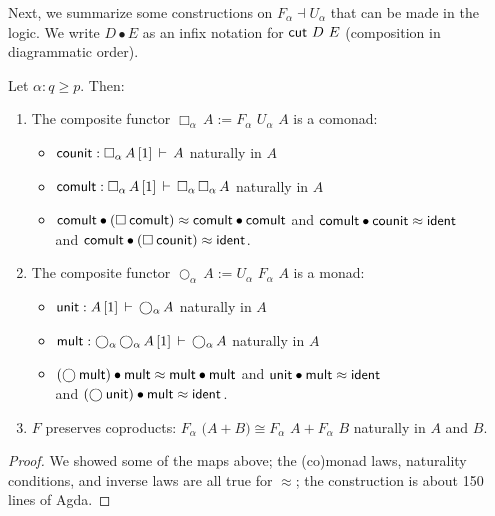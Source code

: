\documentclass{drl-common/llncs}
\newcommand{\la}{\ensuremath{\dashv}}
\newcommand\F[2]{\ensuremath{F_{#1} \,\, #2}}
\newcommand\U[2]{\ensuremath{U_{#1} \,\, #2}}
\newcommand\coprd[2]{\ensuremath{#1 + #2}}
\newcommand\seq[3]{\ensuremath{#1 \, [ #2 ] \, \vdash \, #3}}
\newcommand\ident[1]{\ensuremath{\dsd{ident}_{#1}}}
\newcommand\cutsym{\ensuremath{\dsd{cut}}}
\newcommand\cut[2]{\ensuremath{{\cutsym \,\, #1 \,\, #2}}}
\newcommand\cuti{\ensuremath{\bullet}}
\newcommand\ap[2]{\ensuremath{#1 \approx #2}}
\newcommand\Bx[2]{\ensuremath{\Box_{#1} \, {#2}}}
\newcommand\Crc[2]{\ensuremath{\bigcirc_{#1} \, {#2}}}
\newcommand\iso{\cong}
\begin{document}
Next, we summarize some constructions on $F_\alpha \la U_\alpha$ that
can be made in the logic. We write $D \cuti E$ as an infix notation for
\cut{D}{E} (composition in diagrammatic order).

\begin{lemma} \label{lem:constructionsonadjunctions}
Let $\alpha : q \ge p$.  Then:
\begin{enumerate}
\item The composite functor $\Bx{\alpha}{A} := \F{\alpha}{\U{\alpha}{A}}$ is a comonad:
\begin{itemize}
\item[] $\dsd{counit} : \seq{\Bx \alpha A}{1}{A}$ naturally in $A$
\item[] $\dsd{comult} : \seq{\Bx \alpha A}{1}{\Bx \alpha {\Bx \alpha A}}$
  naturally in $A$
\item[] 
 \ap{\dsd{comult} \cuti (\Bx{}{\dsd{comult}})}{\dsd{comult} \cuti
   \dsd{comult}}
and \ap{\dsd{comult} \cuti \dsd{counit}}{\ident{}} \\
and \ap{\dsd{comult} \cuti (\Bx{}{\dsd{counit}})}{\ident{}}.  
\end{itemize}

\item The composite functor $\Crc{\alpha}{A} := \U{\alpha}{\F{\alpha}{A}}$ is a monad:
\begin{itemize}
\item[] $\dsd{unit} : \seq{A}{1}{\Crc \alpha A}$ naturally in $A$
\item[] $\dsd{mult} : \seq{\Crc \alpha {\Crc \alpha A}}{1}{\Crc \alpha A}$
  naturally in $A$
\item[] 
 \ap{(\Crc{}{\dsd{mult}}) \cuti \dsd{mult} }{\dsd{mult} \cuti
   \dsd{mult}}
and \ap{\dsd{unit} \cuti \dsd{mult}}{\ident{}} \\
and \ap{(\Crc{}{\dsd{unit}}) \cuti \dsd{mult}}{\ident{}}.  
\end{itemize}

\item $F$ preserves coproducts: $\F \alpha (\coprd A B) \iso \coprd {\F
  \alpha A} {\F \alpha B}$ naturally in $A$ and $B$.
\end{enumerate}
\end{lemma}

\begin{proof}
We showed some of the maps above; the (co)monad laws, naturality
conditions, and inverse laws are all true for \ap{}{}; the construction
is about 150 lines of Agda.
\end{proof}
\end{document}
